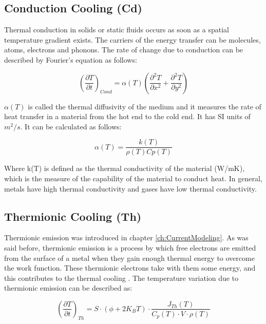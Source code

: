 \subsection{Conduction Cooling (Cd)}

Thermal conduction in solids or static fluids \parencite[][]{ref:ConductionCooling} occurs as soon as a spatial temperature gradient exists. The carriers of the energy transfer can be molecules, atoms, electrons and phonons. The rate of change due to conduction can be described by Fourier's equation as follows: 

\begin{equation}
    \left( \frac{\partial T}{\partial t} \right)_{Cond} = \alpha (T) \left( \frac{\partial^2 T}{\partial x^2} + \frac{\partial^2 T}{\partial y^2} \right)
\end{equation}

$\alpha(T)$ is called the thermal diffusivity of the medium and it measures the rate of heat transfer in a material from the hot end to the cold end. It has SI units of $m^2 /s$. It can be calculated as follows: 

\begin{equation}
    \alpha(T) = \frac{k(T)}{\rho(T)Cp(T)}
\end{equation}

Where k(T) is defined as the thermal conductivity of the material (W/mK), which is the measure of the capability of the material to conduct heat. In general, metals have high thermal conductivity and gases have low thermal conductivity. 

\subsection{Thermionic Cooling (Th)}

Thermionic emission was introduced in chapter \ref{ch:CurrentModeling}. As was said before, thermionic emission is a process by which free electrons are emitted from the surface of a metal when they gain enough thermal energy to overcome the work function. These thermionic electrons take with them some energy, and this contributes to the thermal cooling \parencite[][]{ref:ThermoCooling}. The temperature variation due to thermionic emission can be described as: 

\begin{equation}
    \left(\frac{\partial T}{\partial t}\right)_{Th} = S\cdot \left( \phi +2K_B T\right)\cdot \frac{J_{Th}(T)}{C_p(T)\cdot V \cdot \rho(T)}
\end{equation}

